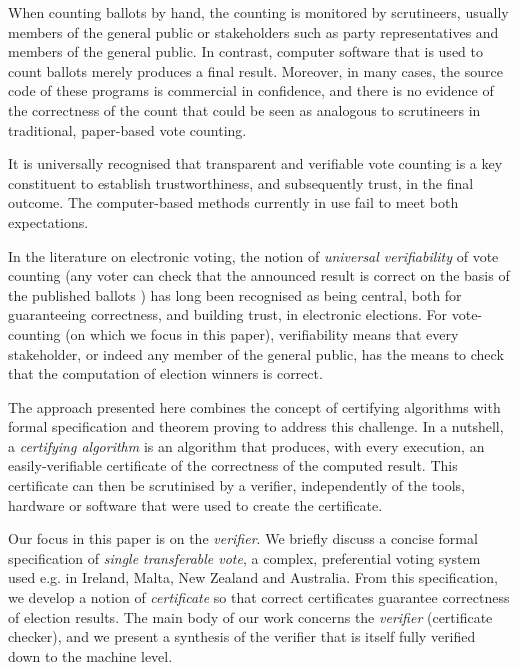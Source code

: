 \documentclass{llncs}
\begin{document}
When counting ballots by hand,  the counting is monitored by
scrutineers, usually members of the general public or stakeholders
such as party representatives and members of the general public. 
%
In contrast,  computer software that is used to count ballots 
merely produces a final result. Moreover, in many cases, the source
code of these programs is commercial in confidence, and there is no
evidence of the correctness of the count that could be seen as
analogous to scrutineers in traditional, paper-based vote counting.

It is universally recognised that transparent and verifiable vote
counting is a key constituent to 
establish trustworthiness, and subsequently trust, in the final outcome. 
The computer-based methods 
currently in use fail to meet both expectations.  

In the literature on electronic voting, the notion of \emph{universal
verifiability} of vote counting (any voter can check that the
announced result is correct on the basis of the published ballots
\cite{Kremer:2010:EVE}) has long been recognised as being
central,
both for guaranteeing  correctness, and building trust,
in electronic elections. For vote-counting (on which we focus in
this paper), verifiability means that every stakeholder, or indeed
any
member of the general public, has the means to check that the
computation
of election winners is correct.

The approach presented here combines the concept of certifying
algorithms \cite{McConnell:2011:CA} with formal specification and
theorem proving to address this challenge. In a nutshell, a
\emph{certifying algorithm} is an algorithm that produces, with
every execution, an easily-verifiable certificate of the correctness
of the computed result.  This certificate can then be scrutinised by
a verifier, independently of the tools, hardware or software that
were used to create the certificate. 

Our focus in this paper is on the \emph{verifier}. We briefly
discuss a 
concise formal specification of \emph{single transferable vote}, a
complex, preferential voting system used e.g. in Ireland, Malta, New
Zealand and Australia. From this specification, we develop a notion
of \emph{certificate} so that correct certificates guarantee
correctness of election results. The main body of our work concerns
the \emph{verifier} (certificate checker), and we present a
synthesis of the verifier that is itself fully verified down to the
machine level. 
\end{document}
